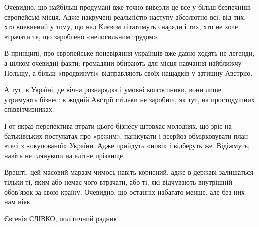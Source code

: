 Очевидно, що найбільш продумані вже точно вивезли це все у більш безпечніші
європейські місця. Адже накручені реальністю наступу абсолютно всі: від тих,
хто впевнений у тому, що над Києвом літатимуть снаряди і тих, хто не хоче
втрачати те, що зароблено «непосильним трудом».

В принципі, про європейське поневіряння українців вже давно ходять не легенди,
а цілком очевидні факти: громадяни обирають для місця навчання найближчу
Польщу, а більш «продвинуті» відправляють своїх нащадків  у затишну Австрію.

А тут, в Україні, де вічна рознарядка і умовні колгоспники, вони лише утримують
бізнес: в жодній Австрії стільки не заробиш, як тут, на простодушних
співвітчизниках.

І от якраз перспектива втрати цього бізнесу штовхає молодняк, що зріс на
батьківських постулатах про «режим», панікувати і всерйоз обмірковувати план
втечі з «окупованої» України. Адже прийдуть «нові» і відберуть же. Відіжмуть,
навіть не глянувши на елітне прізвище.

Врешті, цей масовий маразм чимось навіть корисний, адже в державі залишаться
тільки ті, яким або немає чого втрачати, або ті, які відчувають  внутрішній
обов'язок за свою країну. Очевидно, що останніх набагато менше, але без них нам
ніяк.

Євгенія СЛІВКО, політичний радник

